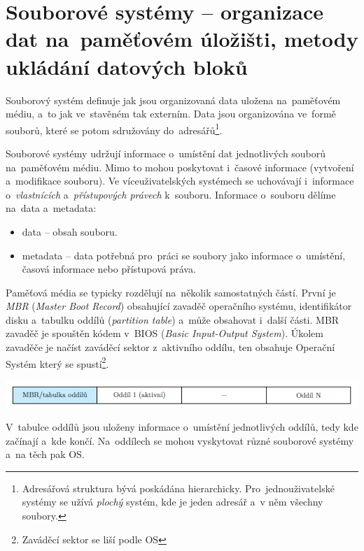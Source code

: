 
\clearpage
\section{Souborové systémy -- organizace dat na~paměťovém úložišti, metody ukládání datových bloků}

Souborový systém definuje jak jsou organizovaná data uložena na~paměťovém médiu, a~to jak ve~stavěném tak externím. Data jsou organizována ve~formě souborů, které se potom sdružovány do~adresářů\footnote{Adresářová struktura bývá poskádána hierarchicky. Pro~jednouživatelské systémy se užívá \emph{plochý} systém, kde je jeden adresář a~v něm všechny soubory.}. 

\vspace{0,5cm}

Souborové systémy udržují informace o~umístění dat jednotlivých souborů na~paměťovém médiu. Mimo to mohou poskytovat i~časové informace (vytvoření a~modifikace souboru). Ve víceuživatelských systémech se uchovávají i~informace o~\emph{vlastnících} a~\emph{přístupových právech} k~souboru. Informace o~souboru dělíme na~data a~metadata:
\begin{itemize}
	\item data -- obsah souboru.
	\item metadata -- data potřebná pro~práci se soubory jako informace o~umístění, časová informace nebo přístupová práva. 
\end{itemize}

Paměťová média se typicky rozdělují na~několik samostatných částí. První je \emph{MBR} (\emph{Master Boot Record}) obsahující zavaděč operačního systému, identifikátor disku a~tabulku oddílů (\emph{partition table}) a~může obsahovat i~další části. MBR zavaděč je spouštěn kódem v~BIOS (\emph{Basic Input-Output System}). Úkolem zavaděče je načíst zaváděcí sektor z~aktivního oddílu, ten obsahuje Operační Systém který se spustí\footnote{Zaváděcí sektor se liší podle OS}. 

\begin{center}
	\includegraphics[scale=1]{images/mem_partitions.png}
\end{center}

V~tabulce oddílů jsou uloženy informace o~umístění jednotlivých oddílů, tedy kde začínají a~kde končí. Na~oddílech se mohou vyskytovat různé souborové systémy a~na těch pak OS.

